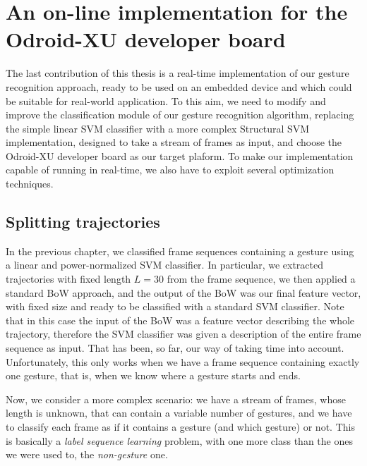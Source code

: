 
\chapter{An on-line implementation for the Odroid-XU developer board}


The last contribution of this thesis is a real-time implementation of our gesture recognition approach, ready to be used on an embedded device and which could be suitable for real-world application. To this aim, we need to modify and improve the classification module of our gesture recognition algorithm, replacing the simple linear SVM classifier with a more complex Structural SVM implementation, designed to take a stream of frames as input, and choose the Odroid-XU developer board as our target plaform. To make our implementation capable of running in real-time, we also have to exploit several optimization techniques.

\section{Splitting trajectories}
In the previous chapter, we classified frame sequences containing a gesture using a linear and power-normalized SVM classifier. In particular, we extracted trajectories with fixed length $L=30$ from the frame sequence, we then applied a standard BoW approach, and the output of the BoW was our final feature vector, with fixed size and ready to be classified with a standard SVM classifier. Note that in this case the input of the BoW was a feature vector describing the whole trajectory, therefore the SVM classifier was given a description of the entire frame sequence as input. That has been, so far, our way of taking time into account. Unfortunately, this only works when we have a frame sequence containing exactly one gesture, that is, when we know where a gesture starts and ends.

Now, we consider a more complex scenario: we have a stream of frames, whose length is unknown, that can contain a variable number of gestures, and we have to classify each frame as if it contains a gesture (and which gesture) or not. This is basically a \textit{label sequence learning} problem, with one more class than the ones we were used to, the \textit{non-gesture} one.

